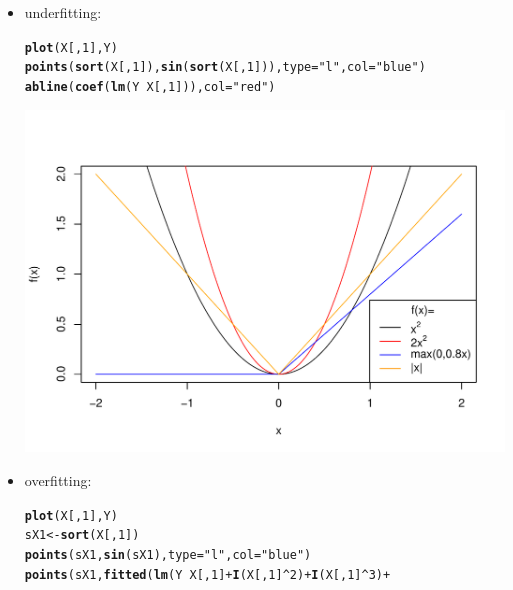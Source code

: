 \documentclass[a4paper]{article}
\makeatletter
\def\maxwidth{ %
  \ifdim\Gin@nat@width>\linewidth
    \linewidth
  \else
    \Gin@nat@width
  \fi
}
\newcommand{\hlnum}[1]{\textcolor[rgb]{0.686,0.059,0.569}{#1}}%
\newcommand{\hlstr}[1]{\textcolor[rgb]{0.192,0.494,0.8}{#1}}%
\newcommand{\hlopt}[1]{\textcolor[rgb]{0,0,0}{#1}}%
\newcommand{\hlstd}[1]{\textcolor[rgb]{0.345,0.345,0.345}{#1}}%
\newcommand{\hlkwb}[1]{\textcolor[rgb]{0.69,0.353,0.396}{#1}}%
\newcommand{\hlkwc}[1]{\textcolor[rgb]{0.333,0.667,0.333}{#1}}%
\newcommand{\hlkwd}[1]{\textcolor[rgb]{0.737,0.353,0.396}{\textbf{#1}}}%
\newenvironment{kframe}{%
 \def\at@end@of@kframe{}%
 \ifinner\ifhmode%
  \def\at@end@of@kframe{\end{minipage}}%
  \begin{minipage}{\columnwidth}%
 \fi\fi%
 \def\FrameCommand##1{\hskip\@totalleftmargin \hskip-\fboxsep
 \colorbox{shadecolor}{##1}\hskip-\fboxsep
     \hskip-\linewidth \hskip-\@totalleftmargin \hskip\columnwidth}%
 \MakeFramed {\advance\hsize-\width
   \@totalleftmargin\z@ \linewidth\hsize
   \@setminipage}}%
 {\par\unskip\endMakeFramed%
 \at@end@of@kframe}
\newenvironment{knitrout}{}{} %
\makeatother
\begin{document}
{\begin{enumerate}
\begin{itemize}
\item underfitting:
\begin{knitrout}
\color{fgcolor}\begin{kframe}
\begin{alltt}
\hlkwd{plot}\hlstd{(X[,}\hlnum{1}\hlstd{], Y)}
\hlkwd{points}\hlstd{(}\hlkwd{sort}\hlstd{(X[,}\hlnum{1}\hlstd{]),} \hlkwd{sin}\hlstd{(}\hlkwd{sort}\hlstd{(X[,}\hlnum{1}\hlstd{])),} \hlkwc{type}\hlstd{=}\hlstr{"l"}\hlstd{,} \hlkwc{col}\hlstd{=}\hlstr{"blue"}\hlstd{)}
\hlkwd{abline}\hlstd{(}\hlkwd{coef}\hlstd{(}\hlkwd{lm}\hlstd{(Y} \hlopt{~} \hlstd{X[,}\hlnum{1}\hlstd{])),} \hlkwc{col}\hlstd{=}\hlstr{"red"}\hlstd{)}
\end{alltt}
\end{kframe}
\includegraphics[width=\maxwidth]{figure/unnamed-chunk-3-1} 
\end{knitrout}
\item overfitting:
\begin{knitrout}
\color{fgcolor}\begin{kframe}
\begin{alltt}
\hlkwd{plot}\hlstd{(X[,}\hlnum{1}\hlstd{], Y)}
\hlstd{sX1} \hlkwb{<-} \hlkwd{sort}\hlstd{(X[,}\hlnum{1}\hlstd{])}
\hlkwd{points}\hlstd{(sX1,} \hlkwd{sin}\hlstd{(sX1),} \hlkwc{type}\hlstd{=}\hlstr{"l"}\hlstd{,} \hlkwc{col}\hlstd{=}\hlstr{"blue"}\hlstd{)}
\hlkwd{points}\hlstd{(sX1,} \hlkwd{fitted}\hlstd{(}\hlkwd{lm}\hlstd{(Y} \hlopt{~} \hlstd{X[,}\hlnum{1}\hlstd{]} \hlopt{+} \hlkwd{I}\hlstd{(X[,}\hlnum{1}\hlstd{]}\hlopt{^}\hlnum{2}\hlstd{)} \hlopt{+} \hlkwd{I}\hlstd{(X[,}\hlnum{1}\hlstd{]}\hlopt{^}\hlnum{3}\hlstd{)} \hlopt{+}

\end{alltt}
\end{kframe}
\end{knitrout}
\end{itemize}
\end{enumerate}}
\end{document}
